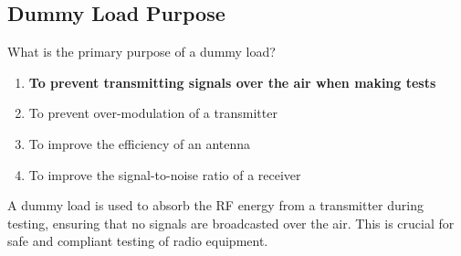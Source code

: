 \subsection{Dummy Load Purpose}
\label{T7C01}

\begin{tcolorbox}[colback=gray!10!white,colframe=black!75!black,title=T7C01]
What is the primary purpose of a dummy load?
\begin{enumerate}[noitemsep]
    \item \textbf{To prevent transmitting signals over the air when making tests}
    \item To prevent over-modulation of a transmitter
    \item To improve the efficiency of an antenna
    \item To improve the signal-to-noise ratio of a receiver
\end{enumerate}
\end{tcolorbox}

A dummy load is used to absorb the RF energy from a transmitter during testing, ensuring that no signals are broadcasted over the air. This is crucial for safe and compliant testing of radio equipment.